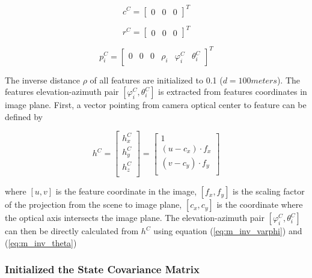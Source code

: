 \begin{equation}
c^{C}=\begin{bmatrix}0&0&0\end{bmatrix}^T
\end{equation}

\begin{equation}
r^{C}=\begin{bmatrix}0&0&0\end{bmatrix}^T
\end{equation}

\begin{equation}
p_{i}^{C}=\begin{bmatrix}0&0&0&\rho _{i}&\varphi_{i}^C&\theta_{i}^C\end{bmatrix}^T
\end{equation}

The inverse distance $\rho$ of all features are initialized to 0.1
($d=100 meters$). The features elevation-azimuth pair $[\varphi _{i}^{C},
\theta _{i}^{C}]$ is extracted from features coordinates in image
plane. First, a vector pointing from camera optical center to feature
can be defined by

\begin{equation}
\label{eq:init_feature_unit_vec}
h^{C}=\begin{bmatrix}
h_{x}^{C}\\
h_{y}^{C}\\
h_{z}^{C}\\
\end{bmatrix}
 = \begin{bmatrix}
1 \\
(u-c_x) \cdot f_{x} \\
(v-c_y) \cdot f_{y} \\
\end{bmatrix}
\end{equation}

\noindent where $[u, v]$ is the feature coordinate in the image, $
[f_{x}, f_{y}]$ is the scaling factor of the projection from the scene
to image plane, $[c_x, c_y]$ is the coordinate where the optical axis
intersects the image plane. The elevation-azimuth pair $[\varphi
_{i}^{C}, \theta _{i}^{C}]$ can then be directly calculated from
$h^{C}$ using equation (\ref{eq:m_inv_varphi}) and (\ref{eq:m_inv_theta})

\subsubsection{Initialized the State Covariance Matrix}

